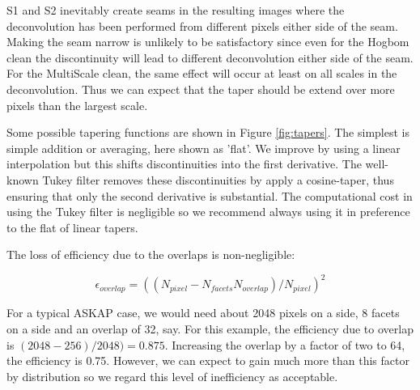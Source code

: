 \documentclass[11pt,a4paper,variablewidth]{article}
\begin{document}
S1 and S2 inevitably create seams in the resulting images where the deconvolution has been performed from different pixels either side of the seam. Making the seam narrow is unlikely to be satisfactory since even for the Hogbom clean the discontinuity will lead to different deconvolution either side of the seam. For the MultiScale clean, the same effect will occur at least on all scales in the deconvolution. Thus we can expect that the taper should be extend over more pixels than the largest scale.

Some possible tapering functions are shown in Figure \ref{fig:tapers}. The simplest is simple addition or averaging, here shown as 'flat'. We improve by using a linear interpolation but this shifts discontinuities into the first derivative. The well-known Tukey filter removes these discontinuities by apply a cosine-taper, thus ensuring that only the second derivative is substantial. The computational cost in using the Tukey filter is negligible so we recommend always using it in preference to the flat of linear tapers.

The loss of efficiency due to the overlaps is non-negligible:

\begin{equation}
\epsilon_{overlap} = \left(\left(N_{pixel} - N_{facets} N_{overlap}\right)/N_{pixel}\right)^2
\end{equation}

For a typical ASKAP case, we would need about 2048 pixels on a side, 8 facets on a side and an overlap of 32, say. For this example, the efficiency due to overlap is $(2048 - 256)/2048) = 0.875$. Increasing the overlap by a factor of two to 64, the efficiency is 0.75. However, we can expect to gain much more than this factor by distribution so we regard this level of inefficiency as acceptable.
\end{document}
